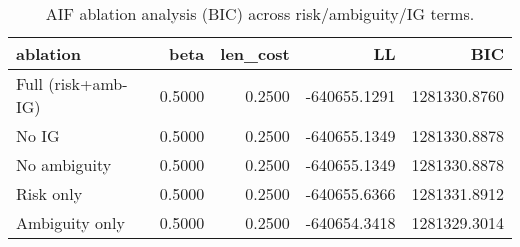 \begin{table}[!ht]
\centering
\begin{table}
\caption{AIF ablation analysis (BIC) across risk/ambiguity/IG terms.}
\label{tab:fig03}
\begin{tabular}{lrrrr}
\toprule
ablation & beta & len\_cost & LL & BIC \\
\midrule
Full (risk+amb-IG) & 0.5000 & 0.2500 & -640655.1291 & 1281330.8760 \\
No IG & 0.5000 & 0.2500 & -640655.1349 & 1281330.8878 \\
No ambiguity & 0.5000 & 0.2500 & -640655.1349 & 1281330.8878 \\
Risk only & 0.5000 & 0.2500 & -640655.6366 & 1281331.8912 \\
Ambiguity only & 0.5000 & 0.2500 & -640654.3418 & 1281329.3014 \\
\bottomrule
\end{tabular}
\end{table}
\end{table}

